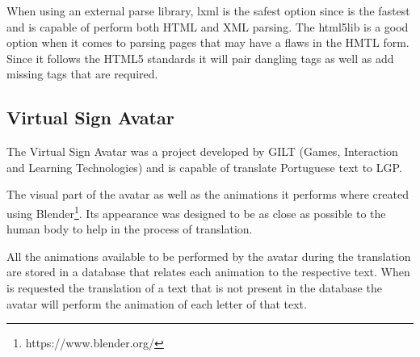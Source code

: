 When using an external parse library, lxml is the safest option since is the fastest and is capable of perform both HTML and XML parsing.
The html5lib is a good option when it comes to parsing pages that may have a flaws in the HMTL form.
Since it follows the HTML5 standards it will pair dangling tags as well as add missing tags that are required.

\subsection{Virtual Sign Avatar}

The Virtual Sign Avatar\cite{escudeiro2015virtual} was a project developed by GILT (Games, Interaction and Learning Technologies) and is capable of translate Portuguese text to \gls{LGP}.

The visual part of the avatar as well as the animations it performs where created using Blender\footnote{https://www.blender.org/}.
Its appearance was designed to be as close as possible to the human body to help in the process of translation.

All the animations available to be performed by the avatar during the translation are stored in a database that relates each animation to the respective text.
When is requested the translation of a text that is not present in the database the avatar will perform the animation of each letter of that text.

